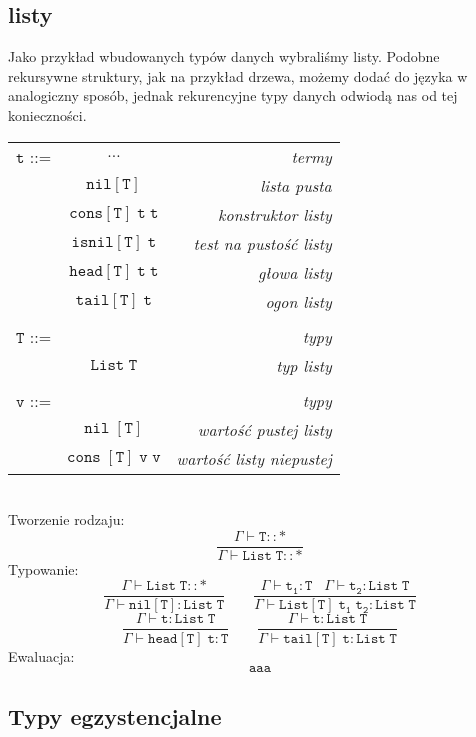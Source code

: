 \documentclass[11pt,leqno]{article}
\begin{document}
\subsection{listy}

Jako przykład wbudowanych typów danych wybraliśmy listy. Podobne rekursywne struktury, jak na przykład drzewa, możemy dodać do języka w analogiczny sposób, jednak rekurencyjne typy danych odwiodą nas od tej konieczności. \\
  
\begin{tabular}{| l c r |}
  \hline
  $\mathtt{t}$ ::= & $\dots$ & \textit{termy}  \\
   & $\mathtt{nil[T]}$ & \textit{lista pusta}  \\
   & $\mathtt{cons[T]\;t\;t}$ & \textit{konstruktor listy} \\
   & $\mathtt{isnil[T]\;t}$ & \textit{test na pustość listy} \\
   & $\mathtt{head[T]\;t\;t}$ & \textit{głowa listy} \\
   & $\mathtt{tail[T]\;t}$ & \textit{ogon listy} \\
   & & \\
  $\mathtt{T}$ ::= &  & \textit{typy} \\
   & $\mathtt{List\;T}$ & \textit{typ listy} \\
   & & \\
  $\mathtt{v}$ ::= &  & \textit{typy} \\
   & $\mathtt{nil\;[T]}$ & \textit{wartość pustej listy} \\
   & $\mathtt{cons\;[T]\;v\;v}$ & \textit{wartość listy niepustej} \\
  \hline
\end{tabular} \\

Tworzenie rodzaju:
 	\[\mathtt{ \frac{\Gamma \vdash T::\ast}{\Gamma \vdash List\;T::\ast}
		}
	\]
Typowanie:
 	\[\mathtt{ \frac{\Gamma \vdash List\;T :: \ast}{\Gamma \vdash nil[T] : List\;T } \qquad \frac{\Gamma \vdash t_1:T \;\;\;\Gamma \vdash t_2:List\;T}{\Gamma \vdash List[T]\;t_1\;t_2:List\;T}
		}
	\]
 	\[\mathtt{ \frac{\Gamma \vdash t:List\;T }{\Gamma \vdash head[T]\;t : T } \qquad \frac{\Gamma \vdash t:List\;T }{\Gamma \vdash tail[T]\;t : List\;T }
		}
	\]
Ewaluacja:
 	\[\mathtt{ aaa
		}
	\]
\subsection{Typy egzystencjalne}
\end{document}
